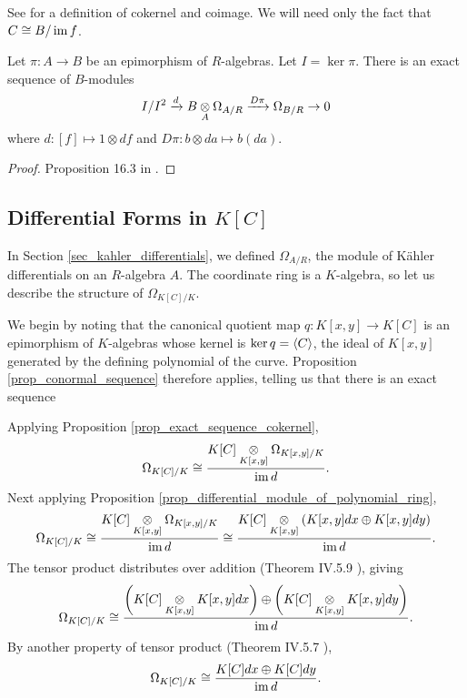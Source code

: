 See \cite{hungerford} for a definition of cokernel and coimage.
We will need only the fact that $C \cong B / \operatorname{im} f$.
\begin{proposition}
  \label{prop_conormal_sequence}
  Let $\pi : A \to B$ be an epimorphism of $R$-algebras.
  Let $I = \ker \pi$.
  There is an exact sequence of $B$-modules
    \[ I/I^2 \xrightarrow{d} B \underset{A}{\otimes} \Omega_{A/R} \xrightarrow{D\pi} \Omega_{B/R} \to 0 \]
  where $d : [f] \mapsto 1 \otimes df$ and $D\pi : b \otimes da \mapsto b(da)$.
\end{proposition}
\begin{proof}
  Proposition 16.3 in \cite{eisenbud95}.
\end{proof}




\subsection{Differential Forms in $K[C]$}

In Section \ref{sec_kahler_differentials}, we defined $\Omega_{A/R}$,
the module of K\"ahler differentials on an $R$-algebra $A$.
The coordinate ring is a $K$-algebra, so let us describe the structure of $\Omega_{K[C]/K}$.

We begin by noting that the canonical quotient map $q : K[x,y] \to K[C]$ is an epimorphism of $K$-algebras
whose kernel is $\ker q = \left\langle C \right\rangle$, the ideal of $K[x,y]$ generated by the defining polynomial of the curve.
Proposition \ref{prop_conormal_sequence} therefore applies, telling us that there is an exact sequence
\begin{center}
\end{center}
Applying Proposition \ref{prop_exact_sequence_cokernel},
\[ \Omega_{K[C]/K} \cong \frac {K[C] \underset{K[x,y]}{\otimes} \Omega_{K[x,y]/K}} {\operatorname{im} d}. \]
Next applying Proposition \ref{prop_differential_module_of_polynomial_ring},
\[ \Omega_{K[C]/K} \cong \frac {K[C] \underset{K[x,y]}{\otimes} \Omega_{K[x,y]/K}} {\operatorname{im} d}
                   \cong \frac {K[C] \underset{K[x,y]}{\otimes} (K[x,y]dx \oplus K[x,y]dy)} {\operatorname{im} d}. \]
The tensor product distributes over addition (Theorem IV.5.9 \cite{hungerford}), giving
\[ \Omega_{K[C]/K} \cong \frac {\left(K[C] \underset{K[x,y]}{\otimes} K[x,y]dx\right) \oplus
                                \left(K[C] \underset{K[x,y]}{\otimes} K[x,y]dy\right)} {\operatorname{im} d}. \]
By another property of tensor product (Theorem IV.5.7 \cite{hungerford}),
\[ \Omega_{K[C]/K} \cong \frac {K[C]dx \oplus K[C]dy} {\operatorname{im} d}. \]

